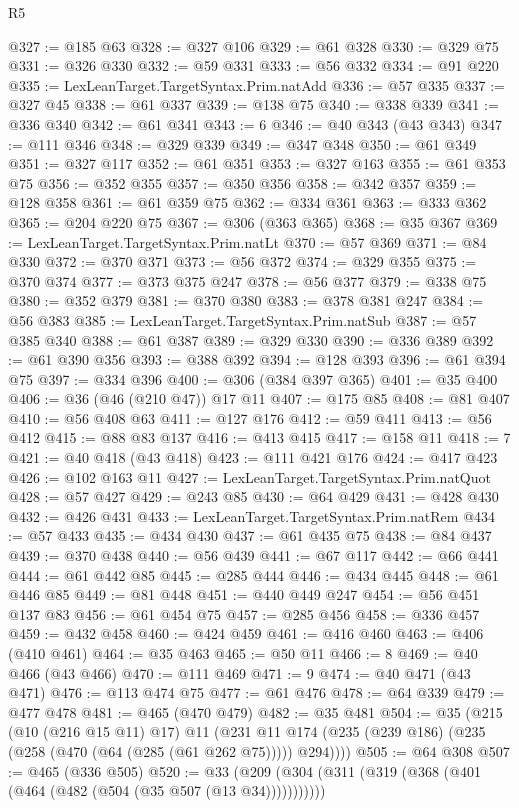 \begin{lexlean}{R5}
\begin{coremodule}
@327 := @185 @63
@328 := @327 @106
@329 := @61 @328
@330 := @329 @75
@331 := @326 @330
@332 := @59 @331
@333 := @56 @332
@334 := @91 @220
@335 := LexLeanTarget.TargetSyntax.Prim.natAdd
@336 := @57 @335
@337 := @327 @45
@338 := @61 @337
@339 := @138 @75
@340 := @338 @339
@341 := @336 @340
@342 := @61 @341
@343 := 6
@346 := @40 @343 (@43 @343)
@347 := @111 @346
@348 := @329 @339
@349 := @347 @348
@350 := @61 @349
@351 := @327 @117
@352 := @61 @351
@353 := @327 @163
@355 := @61 @353 @75
@356 := @352 @355
@357 := @350 @356
@358 := @342 @357
@359 := @128 @358
@361 := @61 @359 @75
@362 := @334 @361
@363 := @333 @362
@365 := @204 @220 @75
@367 := @306 (@363 @365)
@368 := @35 @367
@369 := LexLeanTarget.TargetSyntax.Prim.natLt
@370 := @57 @369
@371 := @84 @330
@372 := @370 @371
@373 := @56 @372
@374 := @329 @355
@375 := @370 @374
@377 := @373 @375 @247
@378 := @56 @377
@379 := @338 @75
@380 := @352 @379
@381 := @370 @380
@383 := @378 @381 @247
@384 := @56 @383
@385 := LexLeanTarget.TargetSyntax.Prim.natSub
@387 := @57 @385 @340
@388 := @61 @387
@389 := @329 @330
@390 := @336 @389
@392 := @61 @390 @356
@393 := @388 @392
@394 := @128 @393
@396 := @61 @394 @75
@397 := @334 @396
@400 := @306 (@384 @397 @365)
@401 := @35 @400
@406 := @36 (@46 (@210 @47)) @17 @11
@407 := @175 @85
@408 := @81 @407
@410 := @56 @408 @63
@411 := @127 @176
@412 := @59 @411
@413 := @56 @412
@415 := @88 @83 @137
@416 := @413 @415
@417 := @158 @11
@418 := 7
@421 := @40 @418 (@43 @418)
@423 := @111 @421 @176
@424 := @417 @423
@426 := @102 @163 @11
@427 := LexLeanTarget.TargetSyntax.Prim.natQuot
@428 := @57 @427
@429 := @243 @85
@430 := @64 @429
@431 := @428 @430
@432 := @426 @431
@433 := LexLeanTarget.TargetSyntax.Prim.natRem
@434 := @57 @433
@435 := @434 @430
@437 := @61 @435 @75
@438 := @84 @437
@439 := @370 @438
@440 := @56 @439
@441 := @67 @117
@442 := @66 @441
@444 := @61 @442 @85
@445 := @285 @444
@446 := @434 @445
@448 := @61 @446 @85
@449 := @81 @448
@451 := @440 @449 @247
@454 := @56 @451 @137 @83
@456 := @61 @454 @75
@457 := @285 @456
@458 := @336 @457
@459 := @432 @458
@460 := @424 @459
@461 := @416 @460
@463 := @406 (@410 @461)
@464 := @35 @463
@465 := @50 @11
@466 := 8
@469 := @40 @466 (@43 @466)
@470 := @111 @469
@471 := 9
@474 := @40 @471 (@43 @471)
@476 := @113 @474 @75
@477 := @61 @476
@478 := @64 @339
@479 := @477 @478
@481 := @465 (@470 @479)
@482 := @35 @481
@504 := @35
    (@215
      (@10 (@216 @15 @11) @17)
      @11
      (@231 @11 @174 (@235 (@239 @186) (@235 (@258 (@470 (@64 (@285 (@61 @262 @75))))) @294))))
@505 := @64 @308
@507 := @465 (@336 @505)
@520 := @33 (@209 (@304 (@311 (@319 (@368 (@401 (@464 (@482 (@504 (@35 @507 (@13 @34)))))))))))

\end{coremodule}
\end{lexlean}
